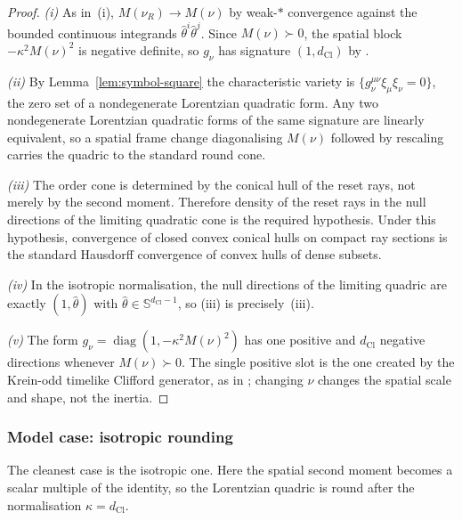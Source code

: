 \documentclass[11pt]{article}
\theoremstyle{definition}
\theoremstyle{remark}
\newcommand{\dCl}{d_{\mathrm{Cl}}}
\newcommand{\Sphere}{\mathbb{S}}
\newcommand{\diag}{\operatorname{diag}}
\begin{document}
\begin{proof}
\emph{(i)} As in \,(i), $M(\nu_R)\to M(\nu)$ by
weak-$*$ convergence against the bounded continuous integrands
$\hat\theta^i\hat\theta^j$.  Since $M(\nu)\succ0$, the spatial block
$-\kappa^2M(\nu)^2$ is negative definite, so $g_\nu$ has signature $(1,\dCl)$ by
.

\emph{(ii)} By Lemma~\ref{lem:symbol-square} the characteristic variety is
$\{g_\nu^{\mu\nu}\xi_\mu\xi_\nu=0\}$, the zero set of a nondegenerate Lorentzian
quadratic form.  Any two nondegenerate Lorentzian quadratic forms of the same
signature are linearly equivalent, so a spatial frame change diagonalising
$M(\nu)$ followed by rescaling carries the quadric to the standard round cone.

\emph{(iii)} The order cone is determined by the conical hull of the reset rays,
not merely by the second moment.  Therefore density of the reset rays in the
null directions of the limiting quadratic cone is the required hypothesis.  Under
this hypothesis, convergence of closed convex conical hulls on compact ray
sections is the standard Hausdorff convergence of convex hulls of dense subsets.

\emph{(iv)} In the isotropic normalisation, the null directions of the limiting
quadric are exactly $(1,\hat\theta)$ with $\hat\theta\in\Sphere^{\dCl-1}$, so
(iii) is precisely \,(iii).

\emph{(v)} The form $g_\nu=\diag(1,-\kappa^2M(\nu)^2)$ has one positive and
$\dCl$ negative directions whenever $M(\nu)\succ0$.  The single positive slot is
the one created by the Krein-odd timelike Clifford generator, as in
; changing $\nu$ changes the spatial scale and shape,
not the inertia.
\end{proof}

\subsubsection{Model case: isotropic rounding}

The cleanest case is the isotropic one.  Here the spatial second moment becomes
a scalar multiple of the identity, so the Lorentzian quadric is round after the
normalisation $\kappa=\dCl$.
\end{document}

